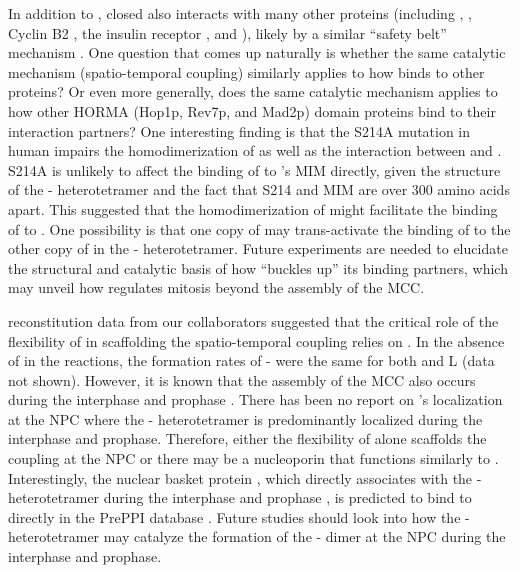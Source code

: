 In addition to , closed  also interacts with many other proteins (including ,  \cite{SGO2-MAD2}, Cyclin B2 \cite{CyclinB2-MAD2}, the insulin receptor \cite{MCC_IREndocytosis}, and  \cite{KIF20A-MAD2}), likely by a similar ``safety belt'' mechanism \cite{Structure1GO4}. One question that comes up naturally is whether the same catalytic mechanism (spatio-temporal coupling) similarly applies to how  binds to other proteins? Or even more generally, does the same catalytic mechanism applies to how other HORMA (Hop1p, Rev7p, and Mad2p) domain proteins \cite{HORMAReview} bind to their interaction partners? One interesting finding is that the S214A mutation in human  impairs the homodimerization of  as well as the interaction between  and  \cite{ATMPhosphorylatesMad1S214}. S214A is unlikely to affect the binding of  to 's MIM directly, given the structure of the - heterotetramer \cite{Structure1GO4} and the fact that S214 and MIM are over 300 amino acids apart. This suggested that the homodimerization of  might facilitate the binding of  to . One possibility is that one copy of  may trans-activate the binding of  to the other copy of  in the - heterotetramer. Future experiments are needed to elucidate the structural and catalytic basis of how  ``buckles up'' its binding partners, which may unveil how  regulates mitosis beyond the assembly of the MCC. %

 reconstitution data from our collaborators suggested that the critical role of the flexibility of  in scaffolding the spatio-temporal coupling relies on . In the absence of  in the reactions, the formation rates of - were the same for both  and \textDelta{}L (data not shown). However, it is known that the assembly of the MCC also occurs during the interphase and prophase \cite{PremitoticMCC}. There has been no report on 's localization at the NPC where the - heterotetramer is predominantly localized during the interphase and prophase. Therefore, either the flexibility of  alone scaffolds the coupling at the NPC or there may be a nucleoporin that functions similarly to . Interestingly, the nuclear basket protein , which directly associates with the - heterotetramer during the interphase and prophase \cite{TPR-MAD1_Lee2008}, is predicted to bind to  directly in the PrePPI database \cite{PrePPI}. Future studies should look into how the - heterotetramer may catalyze the formation of the - dimer at the NPC during the interphase and prophase.

